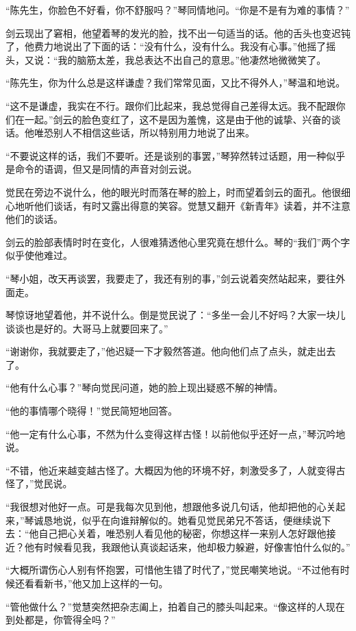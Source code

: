 \par “陈先生，你脸色不好看，你不舒服吗？”琴同情地问。“你是不是有为难的事情？”
\par 剑云现出了窘相，他望着琴的发光的脸，找不出一句适当的话。他的舌头也变迟钝了，他费力地说出了下面的话：“没有什么，没有什么。我没有心事。”他摇了摇头，又说：“我的脑筋太差，我总表达不出自己的意思。”他凄然地微微笑了。
\par “陈先生，你为什么总是这样谦虚？我们常常见面，又比不得外人，”琴温和地说。
\par “这不是谦虚，我实在不行。跟你们比起来，我总觉得自己差得太远。我不配跟你们在一起。”剑云的脸色变红了，这不是因为羞愧，这是由于他的诚挚、兴奋的谈话。他唯恐别人不相信这些话，所以特别用力地说了出来。
\par “不要说这样的话，我们不要听。还是谈别的事罢，”琴猝然转过话题，用一种似乎是命令的语调，但又是同情的声音对剑云说。
\par 觉民在旁边不说什么，他的眼光时而落在琴的脸上，时而望着剑云的面孔。他很细心地听他们谈话，有时又露出得意的笑容。觉慧又翻开《新青年》读着，并不注意他们的谈话。
\par 剑云的脸部表情时时在变化，人很难猜透他心里究竟在想什么。琴的“我们”两个字似乎使他难过。
\par “琴小姐，改天再谈罢，我要走了，我还有别的事，”剑云说着突然站起来，要往外面走。
\par 琴惊讶地望着他，并不说什么。倒是觉民说了：“多坐一会儿不好吗？大家一块儿谈谈也是好的。大哥马上就要回来了。”
\par “谢谢你，我就要走了，”他迟疑一下才毅然答道。他向他们点了点头，就走出去了。
\par “他有什么心事？”琴向觉民问道，她的脸上现出疑惑不解的神情。
\par “他的事情哪个晓得！”觉民简短地回答。
\par “他一定有什么心事，不然为什么变得这样古怪！以前他似乎还好一点，”琴沉吟地说。
\par “不错，他近来越变越古怪了。大概因为他的环境不好，刺激受多了，人就变得古怪了，”觉民说。
\par “我很想对他好一点。可是我每次见到他，想跟他多说几句话，他却把他的心关起来，”琴诚恳地说，似乎在向谁辩解似的。她看见觉民弟兄不答话，便继续说下去：“他自己把心关着，唯恐别人看见他的秘密，你想这样一来别人怎好跟他接近？他有时候看见我，我跟他认真谈起话来，他却极力躲避，好像害怕什么似的。”
\par “大概所谓伤心人别有怀抱罢，可惜他生错了时代了，”觉民嘲笑地说。“不过他有时候还看看新书，”他又加上这样的一句。
\par “管他做什么？”觉慧突然把杂志阖上，拍着自己的膝头叫起来。“像这样的人现在到处都是，你管得全吗？”
